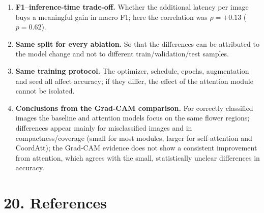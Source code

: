 \documentclass[10pt]{article}
\begin{document}
\begin{enumerate}
\item \textbf{F1--inference-time trade-off.} Whether the additional latency per image buys a meaningful gain in macro F1; here the correlation was $\rho=+0.13$ ($p=0.62$).

\item \textbf{Same split for every ablation.} So that the differences can be attributed to the model change and not to different train/validation/test samples.

\item \textbf{Same training protocol.} The optimizer, schedule, epochs, augmentation and seed all affect accuracy; if they differ, the effect of the attention module cannot be isolated.

\item \textbf{Conclusions from the Grad-CAM comparison.} For correctly classified images the baseline and attention models focus on the same flower regions; differences appear mainly for misclassified images and in compactness/coverage (small for most modules, larger for self-attention and CoordAtt); the Grad-CAM evidence does not show a consistent improvement from attention, which agrees with the small, statistically unclear differences in accuracy.

\end{enumerate}

\section*{20. References}
\end{document}
